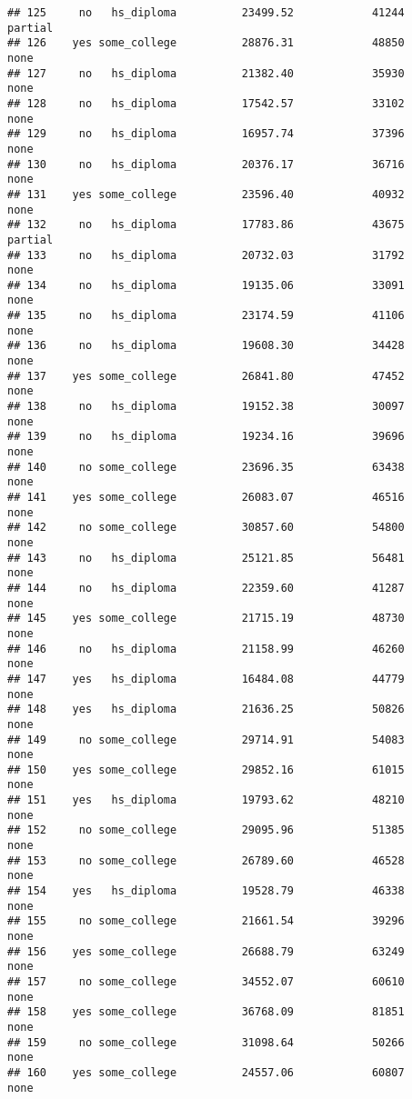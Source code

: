 \documentclass[
]{article}
\begin{document}
\begin{verbatim}
## 125     no   hs_diploma          23499.52            41244     partial
## 126    yes some_college          28876.31            48850        none
## 127     no   hs_diploma          21382.40            35930        none
## 128     no   hs_diploma          17542.57            33102        none
## 129     no   hs_diploma          16957.74            37396        none
## 130     no   hs_diploma          20376.17            36716        none
## 131    yes some_college          23596.40            40932        none
## 132     no   hs_diploma          17783.86            43675     partial
## 133     no   hs_diploma          20732.03            31792        none
## 134     no   hs_diploma          19135.06            33091        none
## 135     no   hs_diploma          23174.59            41106        none
## 136     no   hs_diploma          19608.30            34428        none
## 137    yes some_college          26841.80            47452        none
## 138     no   hs_diploma          19152.38            30097        none
## 139     no   hs_diploma          19234.16            39696        none
## 140     no some_college          23696.35            63438        none
## 141    yes some_college          26083.07            46516        none
## 142     no some_college          30857.60            54800        none
## 143     no   hs_diploma          25121.85            56481        none
## 144     no   hs_diploma          22359.60            41287        none
## 145    yes some_college          21715.19            48730        none
## 146     no   hs_diploma          21158.99            46260        none
## 147    yes   hs_diploma          16484.08            44779        none
## 148    yes   hs_diploma          21636.25            50826        none
## 149     no some_college          29714.91            54083        none
## 150    yes some_college          29852.16            61015        none
## 151    yes   hs_diploma          19793.62            48210        none
## 152     no some_college          29095.96            51385        none
## 153     no some_college          26789.60            46528        none
## 154    yes   hs_diploma          19528.79            46338        none
## 155     no some_college          21661.54            39296        none
## 156    yes some_college          26688.79            63249        none
## 157     no some_college          34552.07            60610        none
## 158    yes some_college          36768.09            81851        none
## 159     no some_college          31098.64            50266        none
## 160    yes some_college          24557.06            60807        none

\end{verbatim}
\end{document}
